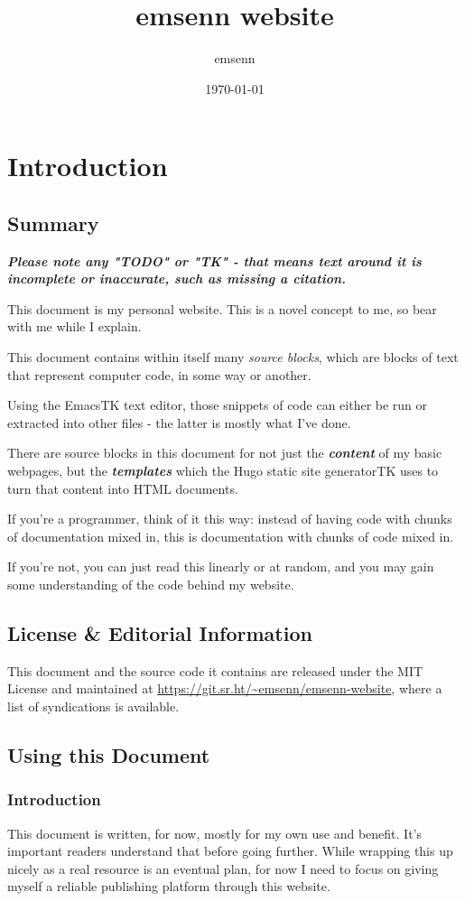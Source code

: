 \documentclass[11pt]{article}
\author{emsenn}
\date{\today}
\title{emsenn website}
\begin{document}
\maketitle
\section{Introduction}
\label{sec:orga7561a5}
\subsection{Summary}
\label{sec:org6389b61}
\textbf{\emph{Please note any "TODO" or "TK" - that means text around it is
incomplete or inaccurate, such as missing a citation.}}


This document is my personal website. This is a novel concept to me,
so bear with me while I explain.

This document contains within itself many \emph{source blocks}, which are
blocks of text that represent computer code, in some way or another.

Using the EmacsTK text editor, those snippets of code can either be
run or extracted into other files - the latter is mostly what I've
done.

There are source blocks in this document for not just the \textbf{\emph{content}}
of my basic webpages, but the \textbf{\emph{templates}} which the Hugo static site
generatorTK uses to turn that content into HTML documents.

If you're a programmer, think of it this way: instead of having code
with chunks of documentation mixed in, this is documentation with
chunks of code mixed in.

If you're not, you can just read this linearly or at random, and you
may gain some understanding of the code behind my website.
\subsection{License \& Editorial Information}
\label{sec:org5377029}
This document and the source code it contains are released under the
MIT License and maintained at
\url{https://git.sr.ht/\~emsenn/emsenn-website}, where a list of syndications
is available.
\subsection{Using this Document}
\label{sec:orgb59874b}
\subsubsection{Introduction}
\label{sec:org584e6a6}
This document is written, for now, mostly for my own use and benefit.
It's important readers understand that before going further. While
wrapping this up nicely as a real resource is an eventual plan, for
now I need to focus on giving myself a reliable publishing platform
through this website.
\end{document}
